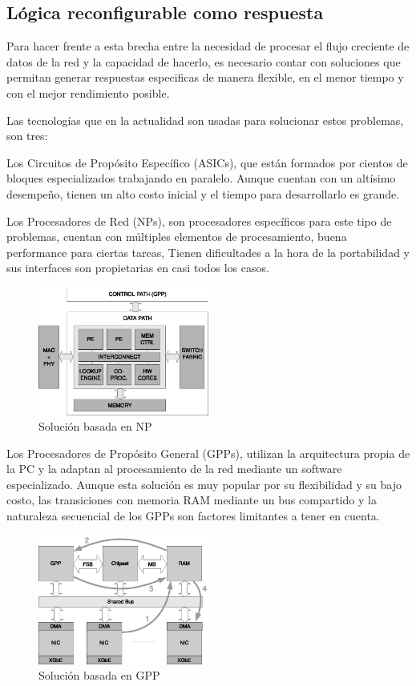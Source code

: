 \subsection{Lógica reconfigurable como respuesta}

Para hacer frente a esta brecha entre la necesidad de procesar el flujo creciente de datos de la red y la capacidad de hacerlo, es necesario contar con soluciones que permitan generar respuestas especificas de manera flexible, en el menor tiempo y con el mejor rendimiento posible.

Las tecnologías que en la actualidad son usadas para solucionar estos problemas, son tres:

Los Circuitos de Propósito Específico (ASICs), que están formados por cientos de bloques especializados trabajando en paralelo. Aunque cuentan con un altísimo desempeño, tienen un alto costo inicial y el tiempo para desarrollarlo es grande.

Los Procesadores de Red (NPs), son procesadores específicos para este tipo de problemas, cuentan con múltiples elementos de procesamiento, buena performance para ciertas tareas, Tienen dificultades a la hora de la portabilidad y sus interfaces son propietarias en casi todos los casos.
\begin{figure}[h]
  \centering
      \includegraphics[width=0.5\textwidth]{1-introduccion/graf/NP_based.eps}
  \caption{Solución basada en NP}
  \label{fig:diseno}
\end{figure}
\newpage

Los Procesadores de Propósito General (GPPs), utilizan la arquitectura propia de la PC y la adaptan al procesamiento de la red mediante un software especializado. Aunque esta solución es muy popular por su flexibilidad y su bajo costo, las transiciones con memoria RAM mediante un bus compartido y la naturaleza secuencial de los GPPs son factores limitantes a tener en cuenta. 
 \begin{figure}[h]
  \centering
      \includegraphics[width=0.5\textwidth]{1-introduccion/graf/GPP_based.eps}
  \caption{Solución basada en GPP}
  \label{fig:diseno}
\end{figure}

